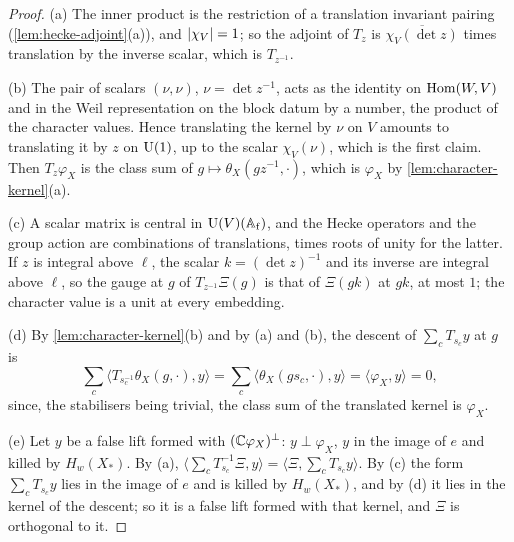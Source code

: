 \begin{proof}
(a) The inner product is the restriction of a translation invariant pairing (\cref{lem:hecke-adjoint}(a)), and $\lvert \chi_V\rvert=1$; so the adjoint of $T_z$ is $\overline{\chi_V(\det z)}$ times translation by the inverse scalar, which is $T_{z^{-1}}$.

(b) The pair of scalars $(\nu,\nu)$, $\nu=\det z^{-1}$, acts as the identity on $\operatorname{Hom}(W,V)$ and in the Weil representation on the block datum by a number, the product of the character values. Hence translating the kernel by $\nu$ on $V$
amounts to translating it by $z$ on $\operatorname{U}(1)$, up to the scalar $\chi_V(\nu)$, which is the first claim. Then $T_z\varphi_X$ is the class sum of $g\mapsto\theta_X(gz^{-1},\cdot)$, which is $\varphi_X$ by \cref{lem:character-kernel}(a).

(c) A scalar matrix is central in $\operatorname{U}(V)(\mathbb{A}_{\rm f})$, and the Hecke operators and the group action are combinations of translations, times roots of unity for the latter. If $z$ is integral above $\ell$, the scalar
$k=(\det z)^{-1}$ and its inverse are integral above $\ell$, so the gauge at $g$ of $T_{z^{-1}}\Xi(g)$ is that of $\Xi(gk)$ at $gk$, at most $1$; the character value is a unit at every embedding.

(d) By \cref{lem:character-kernel}(b) and by (a) and (b), the descent of $\sum_cT_{s_c}y$ at $g$ is
\[
  \sum_c\langle T_{s_c^{-1}}\theta_X(g,\cdot),y\rangle=\sum_c\langle\theta_X(gs_c,\cdot),y\rangle=\langle\varphi_X,y\rangle=0,
\]
since, the stabilisers being trivial, the class sum of the translated kernel is $\varphi_X$.

(e) Let $y$ be a false lift formed with $(\mathbb{C}\varphi_X)^\perp$: $y\perp\varphi_X$, $y$ in the image of $e$ and killed by $H_w(X_*)$. By (a), $\langle\sum_cT_{s_c}^{-1}\Xi,y\rangle=\langle\Xi,\sum_cT_{s_c}y\rangle$. By (c) the form $\sum_cT_{s_c}y$ lies in the image of $e$ and is killed
by $H_w(X_*)$, and by (d) it lies in the kernel of the descent; so it is a false lift formed with that kernel, and $\Xi$ is orthogonal to it.
\end{proof}

